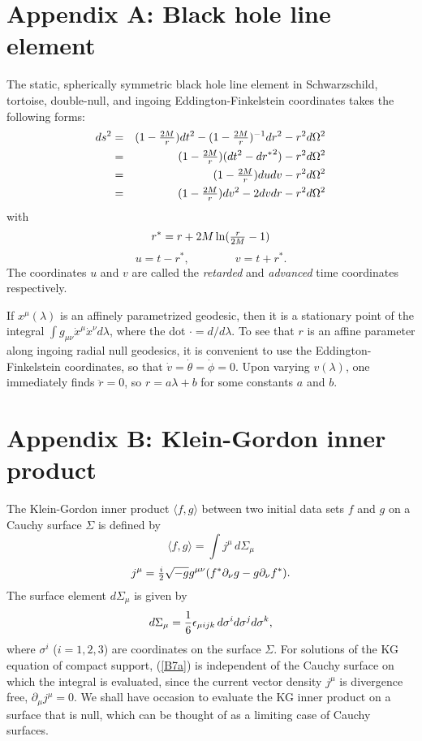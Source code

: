 \documentclass[12pt]{article}
\def\la{\langle}
\def\ra{\rangle}
\begin{document}
\section*{Appendix A: Black hole line element}

The static, spherically symmetric black hole line element
in Schwarzschild, tortoise, double-null, and ingoing
Eddington-Finkelstein coordinates takes the following forms:
\begin{eqnarray} ds^2&=
&(1-{\textstyle{2M\over r}}) dt^2
-(1-{\textstyle{2M\over r}})^{-1} dr^2
-r^2d\Omega^2\\
&=&(1-{\textstyle{2M\over r}}) (dt^2-d{r^*}^2)-r^2d\Omega^2\\
&=&(1-{\textstyle{2M\over r}}) dudv- r^2d\Omega^2\\
&=& (1-{\textstyle{2M\over r}}) dv^2-2 dvdr-r^2d\Omega^2
\end{eqnarray}
with
\begin{equation}
r^*=r+2M\ln({\textstyle{r\over2M}}-1)
\label{tortoise}
\end{equation}
\begin{equation}u=t-r^*,\qquad\qquad v=t+r^*.
\label{uv}
\end{equation}
The coordinates $u$ and $v$ are called the {\it retarded} and
{\it advanced} time coordinates respectively.

If $x^{\mu}(\lambda)$ is an affinely parametrized
geodesic, then it is a stationary point of the integral
$\int g_{\mu\nu}\dot{x}^{\mu}\dot{x}^{\nu} d\lambda$, where
the dot $\cdot=d/d\lambda$.
To see that $r$ is an affine parameter along ingoing radial
null geodesics, it is convenient to use the
Eddington-Finkelstein coordinates, so that
$\dot{v}=\dot{\theta}=\dot{\phi}=0$. Upon varying
$v(\lambda)$, one immediately finds $\ddot{r}=0$,
so $r=a\lambda+b$ for some constants $a$
and $b$.

\section*{Appendix B: Klein-Gordon inner product}

The Klein-Gordon inner product $\la f,g\ra$ between two
initial data sets $f$ and $g$ on a Cauchy
surface $\Sigma$ is defined by
\begin{equation}
\la f,g\ra=\int j^\mu \, d\Sigma_{\mu}
\label{B7a}
\end{equation}
\begin{equation}
j^\mu= {\textstyle {i\over2}}\sqrt{-g}g^{\mu\nu}(f^*\partial_\nu
g-g\partial_\nu f^*).
\end{equation}
The surface element $d\Sigma_\mu$ is given by
\begin{equation}
d\Sigma_\mu={1\over6}\epsilon_{\mu ijk}\, d\sigma^i
d\sigma^j d\sigma^k,
\end{equation}
where $\sigma^i$ ($i=1,2,3$) are coordinates on the surface
$\Sigma$. For solutions of the KG equation of compact
support, (\ref{B7a}) is independent of the Cauchy surface on which
the integral is evaluated, since the current vector density
$j^\mu$ is divergence free, $\partial_\mu j^\mu=0$.
We shall have occasion to evaluate the KG inner product on a
surface that is null, which can be thought of as a limiting
case of Cauchy surfaces.
\end{document}
